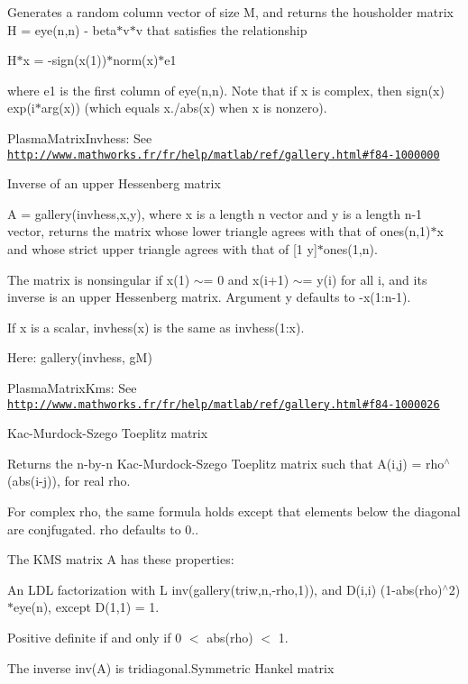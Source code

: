 Generates a random column vector of size M, and returns the housholder matrix H = eye(n,n) -\/ beta$\ast$v$\ast$v\textquotesingle{} that satisfies the relationship

H$\ast$x = -\/sign(x(1))$\ast$norm(x)$\ast$e1

where e1 is the first column of eye(n,n). Note that if x is complex, then sign(x) exp(i$\ast$arg(x)) (which equals x./abs(x) when x is nonzero).

\begin{DoxyItemize}
\item Plasma\+Matrix\+Invhess\+: See \href{http://www.mathworks.fr/fr/help/matlab/ref/gallery.html#f84-1000000}{\tt http\+://www.\+mathworks.\+fr/fr/help/matlab/ref/gallery.\+html\#f84-\/1000000}\end{DoxyItemize}
Inverse of an upper Hessenberg matrix

A = gallery(\textquotesingle{}invhess\textquotesingle{},x,y), where x is a length n vector and y is a length n-\/1 vector, returns the matrix whose lower triangle agrees with that of ones(n,1)$\ast$x\textquotesingle{} and whose strict upper triangle agrees with that of \mbox{[}1 y\mbox{]}$\ast$ones(1,n).

The matrix is nonsingular if x(1) $\sim$= 0 and x(i+1) $\sim$= y(i) for all i, and its inverse is an upper Hessenberg matrix. Argument y defaults to -\/x(1\+:n-\/1).

If x is a scalar, invhess(x) is the same as invhess(1\+:x).

Here\+: gallery(\textquotesingle{}invhess\textquotesingle{}, g\+M)

\begin{DoxyItemize}
\item Plasma\+Matrix\+Kms\+: See \href{http://www.mathworks.fr/fr/help/matlab/ref/gallery.html#f84-1000026}{\tt http\+://www.\+mathworks.\+fr/fr/help/matlab/ref/gallery.\+html\#f84-\/1000026}\end{DoxyItemize}
Kac-\/\+Murdock-\/\+Szego Toeplitz matrix

Returns the n-\/by-\/n Kac-\/\+Murdock-\/\+Szego Toeplitz matrix such that A(i,j) = rho$^\wedge$(abs(i-\/j)), for real rho.

For complex rho, the same formula holds except that elements below the diagonal are conjfugated. rho defaults to 0..

The K\+M\+S matrix A has these properties\+:
\begin{DoxyItemize}
\item An L\+D\+L\textquotesingle{} factorization with L inv(gallery(\textquotesingle{}triw\textquotesingle{},n,-\/rho,1))\textquotesingle{}, and D(i,i) (1-\/abs(rho)$^\wedge$2)$\ast$eye(n), except D(1,1) = 1.
\item Positive definite if and only if 0 $<$ abs(rho) $<$ 1.
\item The inverse inv(\+A) is tridiagonal.\+Symmetric Hankel matrix
\end{DoxyItemize}


